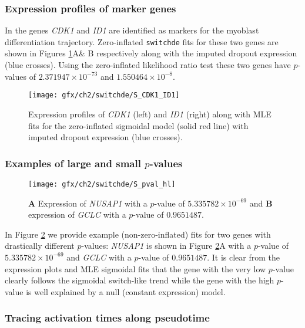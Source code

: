 \subsubsection{Expression profiles of marker genes}

In \cite{Trapnell2014-xi} the genes \emph{CDK1} and \emph{ID1} are identified as markers for the myoblast differentiation trajectory. Zero-inflated \texttt{switchde} fits for these two genes are shown in Figures \ref{fig:S1}A\& B respectively along with the imputed dropout expression (blue crosses). Using the zero-inflated likelihood ratio test these two genes have $p$-values of $2.371947 \times 10^{-73}$ and $1.550464 \times 10^{-8}$.

\begin{figure}[h]
\centering
\texttt{[image: gfx/ch2/switchde/S\_CDK1\_ID1]}
\caption{Expression profiles of \emph{CDK1} (left) and \emph{ID1} (right) along with MLE fits for the zero-inflated sigmoidal model (solid red line) with imputed dropout expression (blue crosses).}\label{fig:S1}
\end{figure}

\subsubsection{Examples of large and small $p$-values}

\begin{figure}[h]%
\centering
\texttt{[image: gfx/ch2/switchde/S\_pval\_hl]}
\caption{\textbf{A} Expression of \emph{NUSAP1} with a $p$-value of $5.335782 \times 10^{-69}$ and \textbf{B} expression of \emph{GCLC} with a $p$-value of $0.9651487$.}\label{fig:S2}
\end{figure}

In Figure \ref{fig:S2} we provide example (non-zero-inflated) fits for two genes with drastically different $p$-values: \emph{NUSAP1} is shown in Figure \ref{fig:S2}A with a $p$-value of $5.335782 \times 10^{-69}$ and \emph{GCLC} with a $p$-value of $0.9651487$. It is clear from the expression plots and MLE sigmoidal fits that the gene with the very low $p$-value clearly follows the sigmoidal switch-like trend while the gene with the high $p$-value is well explained by a null (constant expression) model.

\subsubsection{Tracing activation times along pseudotime}



